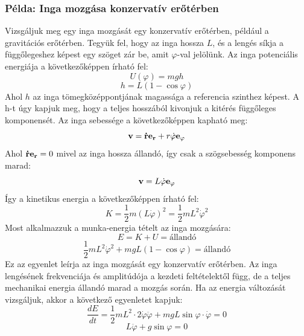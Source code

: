 \documentclass[a4paper,12pt]{article}
\begin{document}
\subsubsection*{Példa: Inga mozgása konzervatív erőtérben}
Vizsgáljuk meg egy inga mozgását egy konzervatív erőtérben, például a gravitációs erőtérben. Tegyük fel, hogy az inga hossza $L$, és a lengés síkja a függőlegeshez képest egy szöget zár be, amit $\varphi$-val jelölünk.
Az inga potenciális energiája a következőképpen írható fel:
\begin{equation}
    U(\varphi) = mgh
\end{equation}
\begin{equation}
    h = L(1 - \cos\varphi)
\end{equation}
Ahol $h$ az inga tömegközéppontjának magassága a referencia szinthez képest. A h-t úgy kapjuk meg, hogy a teljes hosszából kivonjuk a kitérés függőleges komponensét.
Az inga sebessége a következőképpen kapható meg:
\begin{equation}
    \bold{v} = \bold{\dot{r}} \bold{e_r} + r\dot{\varphi} \bold{e_\varphi}
\end{equation}
Ahol $\bold{\dot{r}} \bold{e_r} = 0$ mivel az inga hossza állandó, így csak a szögsebesség komponens marad:
\begin{equation}
    \bold{v} = L\dot{\varphi} \bold{e_\varphi}
\end{equation}
Így a kinetikus energia a következőképpen írható fel:
\begin{equation}
    K = \frac{1}{2} m (L\dot{\varphi})^2 = \frac{1}{2} m L^2 \dot{\varphi}^2
\end{equation}
Most alkalmazzuk a munka-energia tételt az inga mozgására:
\begin{equation}
    E = K + U = \text{állandó}
\end{equation}
\begin{equation}
    \frac{1}{2} m L^2 \dot{\varphi}^2 + mgL(1 - \cos\varphi) = \text{állandó}
\end{equation}
Ez az egyenlet leírja az inga mozgását egy konzervatív erőtérben. Az inga lengésének frekvenciája és amplitúdója a kezdeti feltételektől függ, de a teljes mechanikai energia állandó marad a mozgás során.
Ha az energia változását vizsgáljuk, akkor a következő egyenletet kapjuk:
\begin{equation}
    \frac{dE}{dt} = \frac{1}{2} m L^2 \cdot 2\dot{\varphi}\ddot{\varphi} + mgL \sin\varphi \cdot \dot{\varphi} = 0
\end{equation}
\begin{equation}
    L \ddot{\varphi} + g \sin\varphi = 0
\end{equation}
\end{document}
